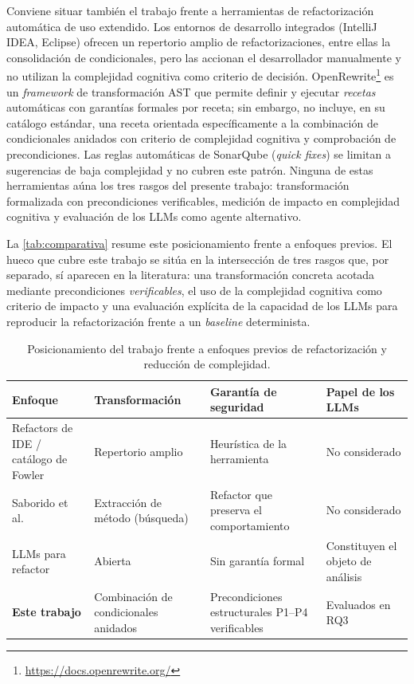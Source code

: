Conviene situar también el trabajo frente a herramientas de refactorización
automática de uso extendido. Los entornos de desarrollo integrados (IntelliJ
IDEA, Eclipse) ofrecen un repertorio amplio de refactorizaciones, entre ellas
la consolidación de condicionales, pero las accionan el desarrollador
manualmente y no utilizan la complejidad cognitiva como criterio de
decisión. OpenRewrite\footnote{\url{https://docs.openrewrite.org/}} es un
\emph{framework} de transformación AST que
permite definir y ejecutar \emph{recetas} automáticas con garantías formales por
receta; sin embargo, no incluye, en su catálogo estándar, una receta orientada
específicamente a la combinación de condicionales anidados con criterio de
complejidad cognitiva y comprobación de precondiciones. Las reglas automáticas de SonarQube
(\emph{quick fixes}) se limitan a sugerencias de baja complejidad y no cubren
este patrón. Ninguna de estas herramientas aúna los tres rasgos del presente
trabajo: transformación formalizada con precondiciones verificables, medición
de impacto en complejidad cognitiva y evaluación de los LLMs como agente
alternativo.

La \autoref{tab:comparativa} resume este posicionamiento frente a enfoques
previos. El hueco que cubre este trabajo se sitúa en la intersección de tres
rasgos que, por separado, sí aparecen en la literatura: una transformación
concreta acotada mediante precondiciones \emph{verificables}, el uso de la
complejidad cognitiva como criterio de impacto y una evaluación explícita de
la capacidad de los LLMs para reproducir la refactorización frente a un
\emph{baseline} determinista.

\begin{table}[H]
\centering
\caption{Posicionamiento del trabajo frente a enfoques previos de refactorización y reducción de complejidad.}
\label{tab:comparativa}
\small
\begin{tabularx}{\linewidth}{@{}p{3cm}>{\raggedright\arraybackslash}X>{\raggedright\arraybackslash}X>{\raggedright\arraybackslash}X@{}}
\toprule
\textbf{Enfoque} & \textbf{Transformación} & \textbf{Garantía de seguridad} & \textbf{Papel de los LLMs} \\
\midrule
Refactors de IDE / catálogo de Fowler~\cite{fowler2018refactoring}
  & Repertorio amplio
  & Heurística de la herramienta
  & No considerado \\
Saborido et al.~\cite{10.1109/ACCESS.2022.3144743}
  & Extracción de método (búsqueda)
  & Refactor que preserva el comportamiento
  & No considerado \\
LLMs para refactor~\cite{10.1016/j.eswa.2024.123602, liu2024llmrefactoring}
  & Abierta
  & Sin garantía formal
  & Constituyen el objeto de análisis \\
\textbf{Este trabajo}
  & Combinación de condicionales anidados
  & Precondiciones estructurales P1--P4 verificables
  & Evaluados en RQ3 \\
\bottomrule
\end{tabularx}
\end{table}
